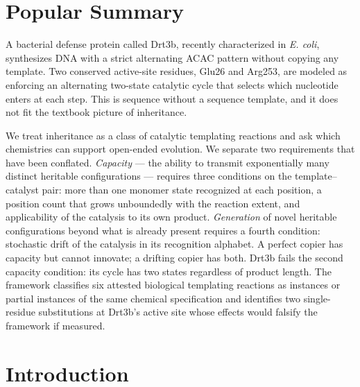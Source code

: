 \documentclass[aps,prx,reprint,amsmath,amssymb,floatfix,superscriptaddress,nofootinbib]{revtex4-2}
\theoremstyle{plain-thm}
\theoremstyle{definition-thm}
\begin{document}
\maketitle

\section*{Popular Summary}

A bacterial defense protein called Drt3b, recently characterized in \emph{E. coli}, synthesizes DNA with a strict alternating ACAC pattern without copying any template. Two conserved active-site residues, Glu26 and Arg253, are modeled as enforcing an alternating two-state catalytic cycle that selects which nucleotide enters at each step. This is sequence without a sequence template, and it does not fit the textbook picture of inheritance.

We treat inheritance as a class of catalytic templating reactions and ask which chemistries can support open-ended evolution. We separate two requirements that have been conflated. \emph{Capacity} --- the ability to transmit exponentially many distinct heritable configurations --- requires three conditions on the template--catalyst pair: more than one monomer state recognized at each position, a position count that grows unboundedly with the reaction extent, and applicability of the catalysis to its own product. \emph{Generation} of novel heritable configurations beyond what is already present requires a fourth condition: stochastic drift of the catalysis in its recognition alphabet. A perfect copier has capacity but cannot innovate; a drifting copier has both. Drt3b fails the second capacity condition: its cycle has two states regardless of product length. The framework classifies six attested biological templating reactions as instances or partial instances of the same chemical specification and identifies two single-residue substitutions at Drt3b's active site whose effects would falsify the framework if measured.


\section{Introduction}
\end{document}
